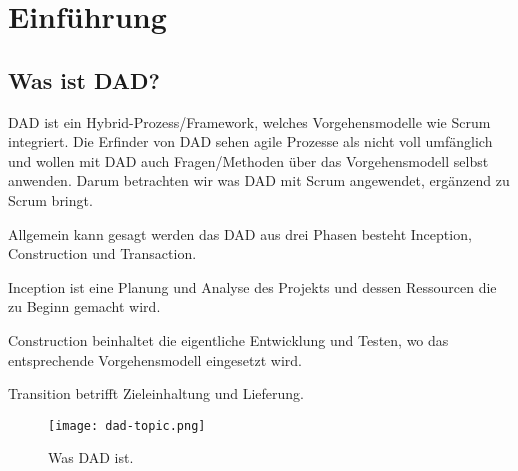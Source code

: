 
\chapter{Einführung}
\thispagestyle{fancy}

\section{Was ist DAD?}

DAD ist ein Hybrid-Prozess/Framework, welches Vorgehensmodelle wie Scrum integriert. Die Erfinder von DAD sehen agile Prozesse als nicht voll umfänglich und wollen mit DAD auch Fragen/Methoden über das Vorgehensmodell selbst anwenden.\newline
Darum betrachten wir was DAD mit Scrum angewendet, ergänzend zu Scrum bringt.\medskip

Allgemein kann gesagt werden das DAD aus drei Phasen besteht Inception, Construction und Transaction.\smallskip

Inception ist eine Planung und Analyse des Projekts und dessen Ressourcen die zu Beginn gemacht wird.\smallskip

Construction beinhaltet die eigentliche Entwicklung und Testen, wo das entsprechende Vorgehensmodell eingesetzt wird.\smallskip

Transition betrifft Zieleinhaltung und Lieferung.



\begin{figure}[h!]
	\centering
	\texttt{[image: dad-topic.png]}
	\caption{Was DAD ist.}
	\label{fig:birds}
\end{figure}

